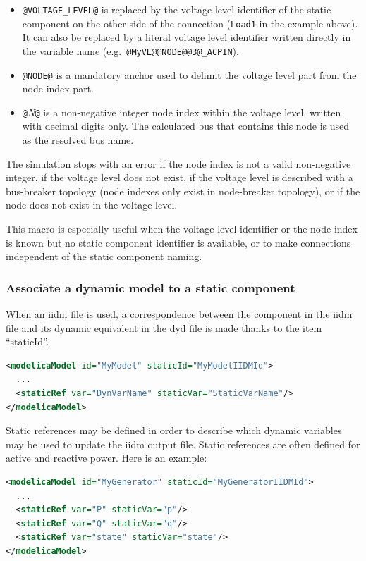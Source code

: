 \documentclass[a4paper, 12pt]{report}
\begin{document}
\begin{itemize}
  \item \verb|@VOLTAGE_LEVEL@| is replaced by the voltage level identifier of the static component on the other side of the connection (\verb|Load1| in the example above). It can also be replaced by a literal voltage level identifier written directly in the variable name (e.g.\ \verb|@MyVL@@NODE@@3@_ACPIN|).
  \item \verb|@NODE@| is a mandatory anchor used to delimit the voltage level part from the node index part.
  \item \verb|@|\textit{N}\verb|@| is a non-negative integer node index within the voltage level, written with decimal digits only. The calculated bus that contains this node is used as the resolved bus name.
\end{itemize}

The simulation stops with an error if the node index is not a valid non-negative integer, if the voltage level does not exist, if the voltage level is described with a bus-breaker topology (node indexes only exist in node-breaker topology), or if the node does not exist in the voltage level.

This macro is especially useful when the voltage level identifier or the node index is known but no static component identifier is available, or to make connections independent of the static component naming.

\subsubsection{Associate a dynamic model to a static component}

When an iidm file is used, a correspondence between the component in the iidm file and its dynamic equivalent in the dyd file is made thanks to the item ``staticId''.
\begin{lstlisting}[language=XML, morekeywords={staticId}]
<modelicaModel id="MyModel" staticId="MyModelIIDMId">
  ...
  <staticRef var="DynVarName" staticVar="StaticVarName"/>
</modelicaModel>
\end{lstlisting}

Static references may be defined in order to describe which dynamic variables may be used to update the iidm output file. Static references are often defined for active and reactive power. Here is an example:
\begin{lstlisting}[language=XML, morekeywords={staticRef}]
<modelicaModel id="MyGenerator" staticId="MyGeneratorIIDMId">
  ...
  <staticRef var="P" staticVar="p"/>
  <staticRef var="Q" staticVar="q"/>
  <staticRef var="state" staticVar="state"/>
</modelicaModel>
\end{lstlisting}
\end{document}
